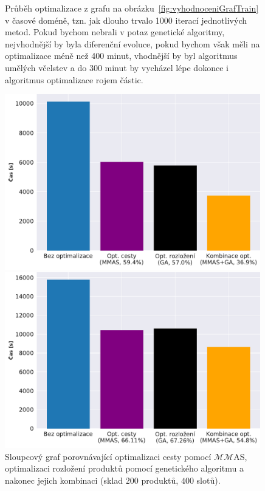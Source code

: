 \begin{figure}[t]
\begin{minipage}{0.49\textwidth}
        \caption{Průběh optimalizace z grafu na obrázku~\ref{fig:vyhodnoceniGrafTrain} v časové doméně, tzn. jak dlouho trvalo 1000 iterací jednotlivých metod. Pokud bychom nebrali v potaz genetické algoritmy, nejvhodnější by byla diferenční evoluce, pokud bychom však měli na optimalizace méně než 400 minut, vhodnější by byl algoritmus umělých včelstev a do 300 minut by vycházel lépe dokonce i algoritmus optimalizace rojem částic.}
        \label{fig:vyhodnoceniGrafTrainCas}
    \end{minipage}\hfill
\end{figure}

\begin{figure}[t]
    \centering
    \begin{minipage}{0.49\textwidth}
        \centering
        \includegraphics[width=0.99\textwidth]{figures/vyhodnoceni/plotOptimizersComparison.pdf}
        \caption{Sloupcový graf porovnávající optimalizaci cesty pomocí $\mathcal{M}\!\!\mathcal{M}$AS, optimalizaci rozložení produktů pomocí genetického algoritmu a nakonec jejich kombinaci (sklad $200$ produktů, $400$ slotů).}
        \label{fig:vyhodnoceniPorovnaniOpt}
    \end{minipage}\hfill
    \begin{minipage}{0.49\textwidth}
        \centering
        \includegraphics[width=0.99\textwidth]{figures/vyhodnoceni/plotOptimizersComparison7501000.pdf}

\end{minipage}
\end{figure}
